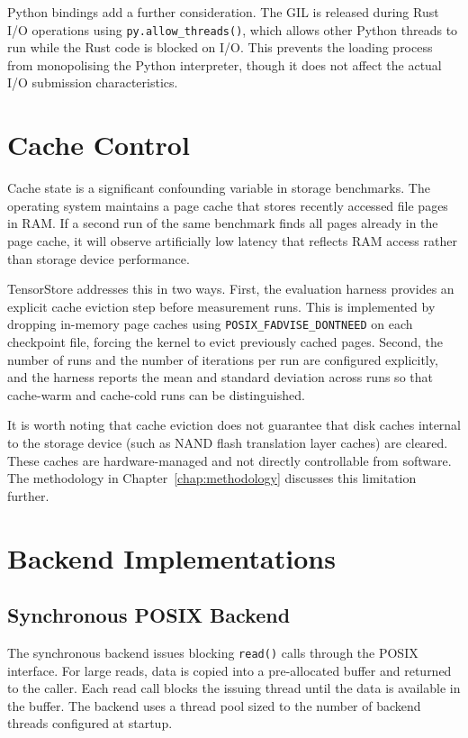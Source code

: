 Python bindings add a further consideration. The GIL is released during Rust I/O operations using \texttt{py.allow\_threads()}, which allows other Python threads to run while the Rust code is blocked on I/O. This prevents the loading process from monopolising the Python interpreter, though it does not affect the actual I/O submission characteristics.

\section{Cache Control}

Cache state is a significant confounding variable in storage benchmarks. The operating system maintains a page cache that stores recently accessed file pages in RAM. If a second run of the same benchmark finds all pages already in the page cache, it will observe artificially low latency that reflects RAM access rather than storage device performance.

TensorStore addresses this in two ways. First, the evaluation harness provides an explicit cache eviction step before measurement runs. This is implemented by dropping in-memory page caches using \texttt{POSIX\_FADVISE\_DONTNEED} on each checkpoint file, forcing the kernel to evict previously cached pages. Second, the number of runs and the number of iterations per run are configured explicitly, and the harness reports the mean and standard deviation across runs so that cache-warm and cache-cold runs can be distinguished.

It is worth noting that cache eviction does not guarantee that disk caches internal to the storage device (such as NAND flash translation layer caches) are cleared. These caches are hardware-managed and not directly controllable from software. The methodology in Chapter~\ref{chap:methodology} discusses this limitation further.

\section{Backend Implementations}

\subsection{Synchronous POSIX Backend}

The synchronous backend issues blocking \texttt{read()} calls through the POSIX interface. For large reads, data is copied into a pre-allocated buffer and returned to the caller. Each read call blocks the issuing thread until the data is available in the buffer. The backend uses a thread pool sized to the number of backend threads configured at startup.

